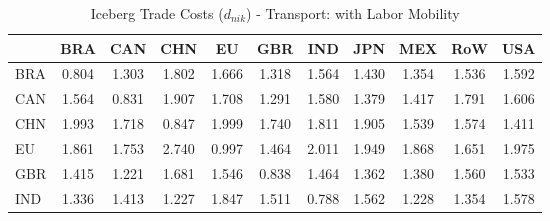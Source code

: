 \begin{table}[htbp]
\centering
\caption{Iceberg Trade Costs ($d_{nik}$) - Transport: with Labor Mobility} 
\label{tab:iceberg_Transport}
\begin{tabular}{lcccccccccc}
  \hline
 & BRA & CAN & CHN & EU & GBR & IND & JPN & MEX & RoW & USA \\ 
  \hline
BRA & \textcolor[RGB]{247,160,8}{0.804} & \textcolor[RGB]{212,137,43}{1.303} & \textcolor[RGB]{48,31,207}{1.802} & \textcolor[RGB]{89,58,166}{1.666} & \textcolor[RGB]{209,135,46}{1.318} & \textcolor[RGB]{122,79,133}{1.564} & \textcolor[RGB]{168,109,87}{1.430} & \textcolor[RGB]{199,129,56}{1.354} & \textcolor[RGB]{138,89,117}{1.536} & \textcolor[RGB]{107,69,148}{1.592} \\ 
  CAN & \textcolor[RGB]{120,78,135}{1.564} & \textcolor[RGB]{242,157,13}{0.831} & \textcolor[RGB]{28,18,227}{1.907} & \textcolor[RGB]{77,50,178}{1.708} & \textcolor[RGB]{217,140,38}{1.291} & \textcolor[RGB]{110,71,145}{1.580} & \textcolor[RGB]{189,122,66}{1.379} & \textcolor[RGB]{171,111,84}{1.417} & \textcolor[RGB]{54,35,201}{1.791} & \textcolor[RGB]{102,66,153}{1.606} \\ 
  CHN & \textcolor[RGB]{18,12,237}{1.993} & \textcolor[RGB]{71,46,184}{1.718} & \textcolor[RGB]{237,153,18}{0.847} & \textcolor[RGB]{15,10,240}{1.999} & \textcolor[RGB]{64,41,191}{1.740} & \textcolor[RGB]{46,30,209}{1.811} & \textcolor[RGB]{31,20,224}{1.905} & \textcolor[RGB]{133,86,122}{1.539} & \textcolor[RGB]{115,74,140}{1.574} & \textcolor[RGB]{181,117,74}{1.411} \\ 
  EU & \textcolor[RGB]{41,26,214}{1.861} & \textcolor[RGB]{61,40,194}{1.753} & \textcolor[RGB]{0,0,255}{2.740} & \textcolor[RGB]{230,148,26}{0.997} & \textcolor[RGB]{161,104,94}{1.464} & \textcolor[RGB]{13,8,242}{2.011} & \textcolor[RGB]{25,16,230}{1.949} & \textcolor[RGB]{38,25,217}{1.868} & \textcolor[RGB]{94,61,161}{1.651} & \textcolor[RGB]{20,13,235}{1.975} \\ 
  GBR & \textcolor[RGB]{173,112,82}{1.415} & \textcolor[RGB]{227,147,28}{1.221} & \textcolor[RGB]{79,51,176}{1.681} & \textcolor[RGB]{130,84,125}{1.546} & \textcolor[RGB]{240,155,15}{0.838} & \textcolor[RGB]{163,106,92}{1.464} & \textcolor[RGB]{194,125,61}{1.362} & \textcolor[RGB]{186,120,69}{1.380} & \textcolor[RGB]{128,82,128}{1.560} & \textcolor[RGB]{143,92,112}{1.533} \\ 
  IND & \textcolor[RGB]{207,134,48}{1.336} & \textcolor[RGB]{176,114,79}{1.413} & \textcolor[RGB]{224,145,31}{1.227} & \textcolor[RGB]{43,28,212}{1.847} & \textcolor[RGB]{145,94,110}{1.511} & \textcolor[RGB]{252,163,3}{0.788} & \textcolor[RGB]{125,81,130}{1.562} & \textcolor[RGB]{222,144,33}{1.228} & \textcolor[RGB]{201,130,54}{1.354} & \textcolor[RGB]{112,73,143}{1.578} \\ 

\end{tabular}
\end{table}
